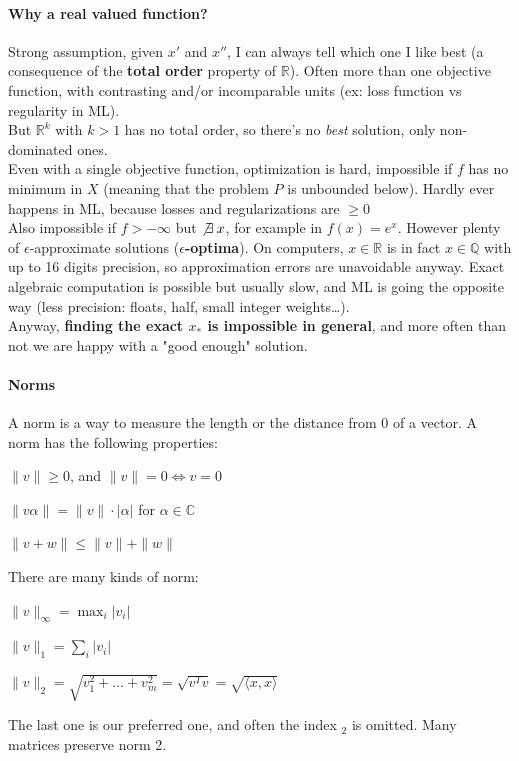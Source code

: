 \documentclass[10pt]{report}
\begin{document}
\paragraph{Why a real valued function?} Strong assumption, given $x'$ and $x''$, I can always tell which one I like best (a consequence of the \textbf{total order} property of $\mathbb{R}$). Often more than one objective function, with contrasting and/or incomparable units (ex: loss function vs regularity in ML).\\
But $\mathbb{R}^k$ with $k > 1$ has no total order, so there's no \textit{best} solution, only non-dominated ones.\\
Even with a single objective function, optimization is hard, impossible if $f$ has no minimum in $X$ (meaning that the problem $P$ is unbounded below). Hardly ever happens in ML, because losses and regularizations are $\geq 0$\\
Also impossible if $f > -\infty$ but $\not\exists\:x$, for example in $f(x) = e^x$. However plenty of $\epsilon$-approximate solutions (\textbf{$\epsilon$-optima}). On computers, $x\in \mathbb{R}$ is in fact $x\in \mathbb{Q}$ with up to 16 digits precision, so approximation errors are unavoidable anyway. Exact algebraic computation is possible but usually slow, and ML is going the opposite way (less precision: floats, half, small integer weights\ldots).\\
Anyway, \textbf{finding the exact $x_*$ is impossible in general}, and more often than not we are happy with a "good enough" solution.
\paragraph{Norms} A norm is a way to measure the length or the distance from $0$ of a vector. A norm has the following properties:
\begin{list}{}{}
	\item $\|v\| \geq 0$, and $\|v\|=0\Leftrightarrow v = 0$
	\item $\|v\alpha\|=\|v\|\cdot|\alpha|$ for $\alpha\in\mathbb{C}$
	\item $\|v+w\| \leq \|v\|+\|w\|$
\end{list}
There are many kinds of norm:
\begin{list}{}{}
	\item $\|v\|_{\infty} = \max_i|v_i|$
	\item $\|v\|_1 = \sum_i|v_i|$
	\item $\|v\|_2 = \sqrt{v_1^2+\ldots+v_m^2} = \sqrt{v^Tv} = \sqrt{\langle x,x\rangle}$
\end{list}
The last one is our preferred one, and often the index $_2$ is omitted. Many matrices preserve norm 2.
\end{document}
